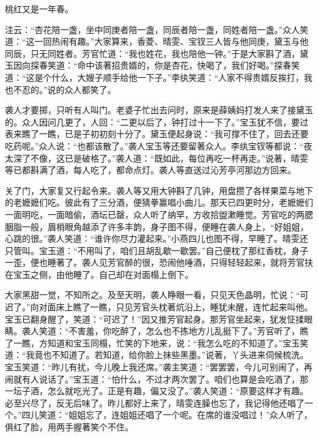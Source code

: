 \begin{poem}
    \begin{pl}
        桃红又是一年春。
    \end{pl}
\end{poem}
\begin{parag}
    注云：“杏花陪一盏，坐中同庚者陪一盏，同辰者陪一盏，同姓者陪一盏。”众人笑道：“这一回热闹有趣。”大家算来，香菱、晴雯、宝钗三人皆与他同庚，黛玉与他同辰，只无同姓者。芳官忙道：“我也姓花，我也陪他一钟。”于是大家斟了酒，黛玉因向探春笑道：“命中该著招贵婿的，你是杏花，快喝了，我们好喝。”探春笑道：“这是个什么，大嫂子顺手给他一下子。”李纨笑道：“人家不得贵婿反挨打，我也不忍的。”说的众人都笑了。
\end{parag}


\begin{parag}
    袭人才要掷，只听有人叫门。老婆子忙出去问时，原来是薛姨妈打发人来了接黛玉的。众人因问几更了，人回：“二更以后了，钟打过十一下了。”宝玉犹不信，要过表来瞧了一瞧，已是子初初刻十分了。黛玉便起身说：“我可撑不住了，回去还要吃药呢。”众人说：“也都该散了。”袭人宝玉等还要留著众人。李纨宝钗等都说：“夜太深了不像，这已是破格了。”袭人道：“既如此，每位再吃一杯再走。”说著，晴雯等已都斟满了酒，每人吃了，都命点灯。袭人等直送过沁芳亭河那边方回来。
\end{parag}


\begin{parag}
    关了门，大家复又行起令来。袭人等又用大钟斟了几钟，用盘攒了各样果菜与地下的老嬷嬷们吃。彼此有了三分酒，便猜拳赢唱小曲儿。那天已四更时分，老嬷嬷们一面明吃，一面暗偷，酒坛已罄，众人听了纳罕，方收拾盥漱睡觉。芳官吃的两腮胭脂一般，眉梢眼角越添了许多丰韵，身子图不得，便睡在袭人身上，“好姐姐，心跳的很。”袭人笑道：“谁许你尽力灌起来。”小燕四儿也图不得，早睡了。晴雯还只管叫。宝玉道：“不用叫了，咱们且胡乱歇一歇罢。”自己便枕了那红香枕，身子一歪，便也睡著了。袭人见芳官醉的很，恐闹他唾酒，只得轻轻起来，就将芳官扶在宝玉之侧，由他睡了。自己却在对面榻上倒下。
\end{parag}


\begin{parag}
    大家黑甜一觉，不知所之。及至天明，袭人睁眼一看，只见天色晶明，忙说：“可迟了。”向对面床上瞧了一瞧，只见芳官头枕著炕沿上，睡犹未醒，连忙起来叫他。宝玉已翻身醒了，笑道：“可迟了！”因又推芳官起身。那芳官坐起来，犹发怔揉眼睛。袭人笑道：“不害羞，你吃醉了，怎么也不拣地方儿乱挺下了。”芳官听了，瞧了一瞧，方知道和宝玉同榻，忙笑的下地来，说：“我怎么吃的不知道了。”宝玉笑道：“我竟也不知道了。若知道，给你脸上抹些黑墨。”说著，丫头进来伺候梳洗。宝玉笑道：“昨儿有扰，今儿晚上我还席。”袭主笑道：“罢罢罢，今儿可别闹了，再闹就有人说话了。”宝玉道：“怕什么，不过才两次罢了。咱们也算是会吃酒了，那一坛子酒，怎么就吃光了。正是有趣，偏又没了。”袭人笑道：“原要这样才有趣。必至兴尽了，反无后味了。昨儿都好上来了，晴雯连臊也忘了，我记得他还唱了一个。”四儿笑道：“姐姐忘了，连姐姐还唱了一个呢。在席的谁没唱过！”众人听了，俱红了脸，用两手握著笑个不住。
\end{parag}


